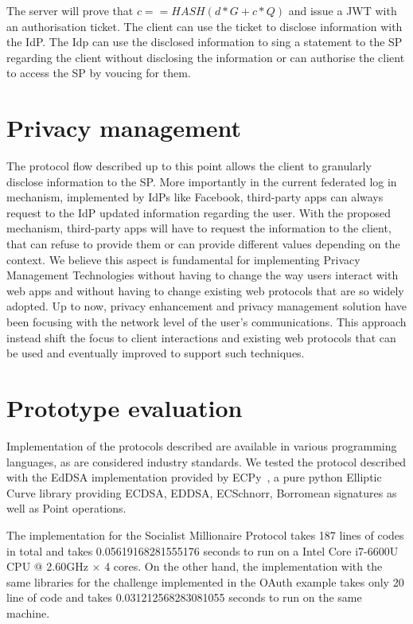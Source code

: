The server will prove that $c == HASH(d * G + c * Q)$ and issue a JWT with an authorisation ticket.
The client can use the ticket to disclose information with the IdP. The Idp can use the disclosed information to sing a statement to the SP regarding the client without disclosing the information or can authorise the client to access the SP by voucing for them.

\section{Privacy management}

The protocol flow described up to this point allows the client to granularly disclose information to the SP. More importantly in the current federated log in mechanism, implemented by IdPs like Facebook, third-party apps can always request to the IdP updated information regarding the user. With the proposed mechanism, third-party apps will have to request the information to the client, that can refuse to provide them or can provide different values depending on the context. 
We believe this aspect is fundamental for implementing Privacy Management Technologies without having to change the way users interact with web apps and without having to change existing web protocols that are so widely adopted. Up to now, privacy enhancement and privacy management solution have been focusing with the network level of the user's communications. This approach instead shift the focus to client interactions and existing web protocols that can be used and eventually improved to support such techniques.

\section{Prototype evaluation}

Implementation of the protocols described are available in various programming languages, as are considered industry standards. We tested the protocol described with the EdDSA implementation provided by ECPy~\cite{ecpy}, a pure python Elliptic Curve library providing ECDSA, EDDSA, ECSchnorr, Borromean signatures as well as Point operations.

The implementation for the Socialist Millionaire Protocol takes 187 lines of codes in total and takes 0.05619168281555176 seconds to run on a Intel Core i7-6600U CPU @ 2.60GHz × 4 cores. On the other hand, the implementation with the same libraries for the challenge implemented in the OAuth example takes only 20 line of code and takes 0.031212568283081055 seconds to run on the same machine.

